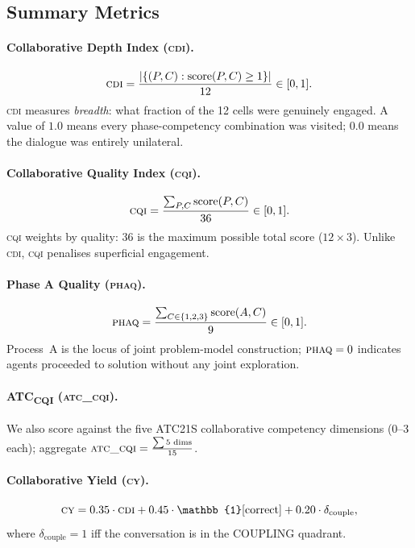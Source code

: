 \documentclass{article}
\newcommand{\CDI}{\textsc{cdi}}
\newcommand{\CQI}{\textsc{cqi}}
\newcommand{\PhAQ}{\textsc{phaq}}
\newcommand{\ATC}{\textsc{atc\_cqi}}
\newcommand{\CY}{\textsc{cy}}
\begin{document}
\subsection{Summary Metrics}

\paragraph{Collaborative Depth Index (\CDI).}
\begin{equation}
  \CDI = \frac{|\{(P,C) : \text{score}(P,C) \geq 1\}|}{12} \in [0, 1].
\end{equation}
\CDI{} measures \emph{breadth}: what fraction of the 12 cells were
genuinely engaged. A value of $1.0$ means every phase-competency
combination was visited; $0.0$ means the dialogue was entirely
unilateral.

\paragraph{Collaborative Quality Index (\CQI).}
\begin{equation}
  \CQI = \frac{\sum_{P,C} \text{score}(P,C)}{36} \in [0, 1].
\end{equation}
\CQI{} weights by quality: 36 is the maximum possible total score
($12 \times 3$). Unlike \CDI{}, \CQI{} penalises superficial
engagement.

\paragraph{Phase A Quality (\PhAQ).}
\begin{equation}
  \PhAQ = \frac{\sum_{C \in \{1,2,3\}} \text{score}(A, C)}{9} \in [0, 1].
\end{equation}
Process~A is the locus of joint problem-model construction; $\PhAQ = 0$ indicates agents proceeded to solution without any joint exploration.

\paragraph{ATC\textsubscript{CQI} (\ATC).}
We also score against the five ATC21S collaborative competency dimensions \citep{griffin2012assessment} (0--3 each); aggregate $\ATC = \frac{\sum 5\text{ dims}}{15}$.

\paragraph{Collaborative Yield (\CY).}
\begin{equation}
  \CY = 0.35 \cdot \CDI + 0.45 \cdot \mathbb{1}[\text{correct}]
        + 0.20 \cdot \delta_{\text{couple}},
\end{equation}
where $\delta_{\text{couple}} = 1$ iff the conversation is in the COUPLING quadrant.
\end{document}

